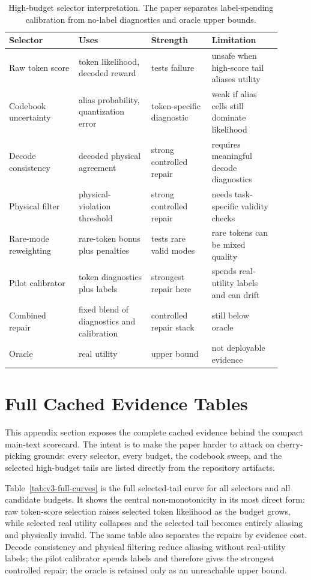 \begin{table}[H]
\caption{High-budget selector interpretation. The paper separates label-spending calibration from no-label diagnostics and oracle upper bounds.}
\label{tab:selectors}
\centering
\small
\begin{tabular}{@{}p{0.23\linewidth}p{0.24\linewidth}p{0.20\linewidth}p{0.23\linewidth}@{}}
\toprule
Selector & Uses & Strength & Limitation \\
\midrule
Raw token score & token likelihood, decoded reward & tests failure & unsafe when high-score tail aliases utility \\
Codebook uncertainty & alias probability, quantization error & token-specific diagnostic & weak if alias cells still dominate likelihood \\
Decode consistency & decoded physical agreement & strong controlled repair & requires meaningful decode diagnostics \\
Physical filter & physical-violation threshold & strong controlled repair & needs task-specific validity checks \\
Rare-mode reweighting & rare-token bonus plus penalties & tests rare valid modes & rare tokens can be mixed quality \\
Pilot calibrator & token diagnostics plus labels & strongest repair here & spends real-utility labels and can drift \\
Combined repair & fixed blend of diagnostics and calibration & controlled repair stack & still below oracle \\
Oracle & real utility & upper bound & not deployable evidence \\
\bottomrule
\end{tabular}
\end{table}

\section{Full Cached Evidence Tables}
\label{app:full-evidence}

This appendix section exposes the complete cached evidence behind the compact main-text scorecard. The intent is to make the paper harder to attack on cherry-picking grounds: every selector, every budget, the codebook sweep, and the selected high-budget tails are listed directly from the repository artifacts.

Table~\ref{tab:v3-full-curves} is the full selected-tail curve for all selectors and all candidate budgets. It shows the central non-monotonicity in its most direct form: raw token-score selection raises selected token likelihood as the budget grows, while selected real utility collapses and the selected tail becomes entirely aliasing and physically invalid. The same table also separates the repairs by evidence cost. Decode consistency and physical filtering reduce aliasing without real-utility labels; the pilot calibrator spends labels and therefore gives the strongest controlled repair; the oracle is retained only as an unreachable upper bound.

